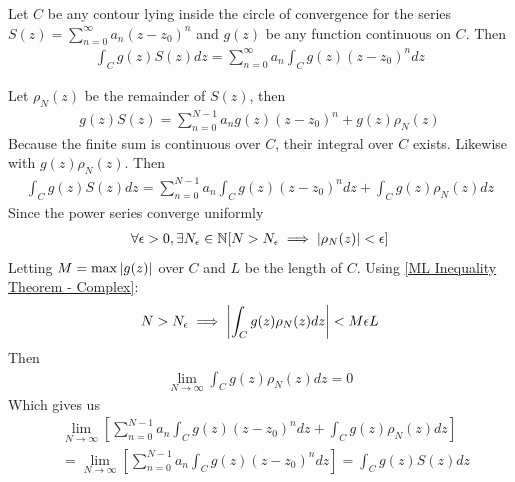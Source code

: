 \documentclass[12pt, english]{book}
\makeatletter
\renewenvironment{proof}[1][\proofname]{\par
	\pushQED{\qed}%
	\normalfont \topsep6\p@\@plus6\p@\relax
	\list{}{%
		\settowidth{\leftmargin}{\itshape\proofname:\hskip\labelsep}%
		\setlength{\labelwidth}{0pt}%
		\setlength{\itemindent}{-\leftmargin}%
		}%
	\item[\hskip\labelsep\itshape#1\@addpunct{:}]\ignorespaces
	}{\popQED\endlist\@endpefalse}
\makeatother
\begin{document}
	\begin{theorem}
		\label{Integration of Power Series Theorem - Complex}
		Let \(C\) be any contour lying inside the circle of convergence for the series 
		\(S(z) = \sum_{n=0}^{\infty} a_n (z-z_0)^n\) and \(g(z)\) be any function continuous on \(C\). Then 
		\begin{align*}
			\int_{C} g(z) S(z) dz = \sum_{n=0}^{\infty} a_n \int_{C} g(z) (z-z_0)^n dz
		\end{align*}
	\end{theorem}
	\begin{proof}
		Let \(\rho_N(z)\) be the remainder of \(S(z)\), then 
		\begin{align*}
			g(z) S(z) = \sum_{n=0}^{N-1}a_n g(z) (z-z_0)^n + g(z) \rho_N(z)
		\end{align*}
		Because the finite sum is continuous over \(C\), their integral over \(C\) exists. Likewise with \(g(z) \rho_N(z)\). Then
		\begin{align*}
			\int_{C} g(z) S(z) dz = \sum_{n=0}^{N-1} a_n \int_{C} g(z) (z-z_0)^n dz + \int_{C} g(z) \rho_N (z) dz
		\end{align*}
		Since the power series converge uniformly
		\begin{align*}
			\forall \epsilon >0, \exists N_\epsilon \in \mathbb{N}
			[N > N_\epsilon \implies \abs{\rho_N(z)} < \epsilon]
		\end{align*}
		Letting \(M = \max \abs{g(z)}\) over \(C\) and \(L\) be the length of \(C\). Using \cref{ML Inequality Theorem - Complex}:
		\begin{align*}
			N > N_\epsilon \implies \abs{\int_{C} g(z) \rho_N(z) dz} < M \epsilon L
		\end{align*}
		Then 
		\begin{align*}
			\lim_{N \rightarrow \infty} \int_{C} g(z) \rho_N (z) dz = 0
		\end{align*}
		Which gives us 
		\begin{align*}
			&\lim_{N \rightarrow \infty} \left[
			\sum_{n=0}^{N-1} a_n \int_{C} g(z) (z-z_0)^n dz + \int_{C} g(z) \rho_N (z) dz
			\right] \\
			&= \lim_{N \rightarrow \infty} \left[
			\sum_{n=0}^{N-1} a_n \int_{C} g(z) (z-z_0)^n dz
			\right] 
			= \int_{C} g(z) S(z) dz
		\end{align*}
	\end{proof}
\end{document}
